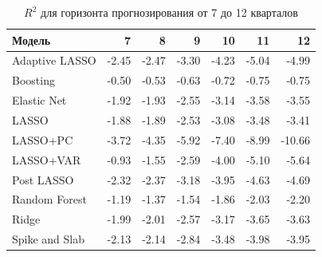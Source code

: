\begin{appendices}
\begin{table}[ht]
\centering
\caption{$R^2$ для горизонта прогнозирования от 7 до 12 кварталов}
\begin{tabular}{lrrrrrr}
  \hline
Модель & 7 & 8 & 9 & 10 & 11 & 12 \\ 
  \hline
Adaptive LASSO & -2.45 & -2.47 & -3.30 & -4.23 & -5.04 & -4.99 \\ 
  Boosting & -0.50 & -0.53 & -0.63 & -0.72 & -0.75 & -0.75 \\ 
  Elastic Net & -1.92 & -1.93 & -2.55 & -3.14 & -3.58 & -3.55 \\ 
  LASSO & -1.88 & -1.89 & -2.53 & -3.08 & -3.48 & -3.41 \\ 
  LASSO+PC & -3.72 & -4.35 & -5.92 & -7.40 & -8.99 & -10.66 \\ 
  LASSO+VAR & -0.93 & -1.55 & -2.59 & -4.00 & -5.10 & -5.64 \\ 
  Post LASSO & -2.32 & -2.37 & -3.18 & -3.95 & -4.63 & -4.69 \\ 
  Random Forest & -1.19 & -1.37 & -1.54 & -1.86 & -2.03 & -2.20 \\ 
  Ridge & -1.99 & -2.01 & -2.57 & -3.17 & -3.65 & -3.63 \\ 
  Spike and Slab & -2.13 & -2.14 & -2.84 & -3.48 & -3.98 & -3.95 \\ 
   \hline
\end{tabular}
\end{table}


\end{appendices}
